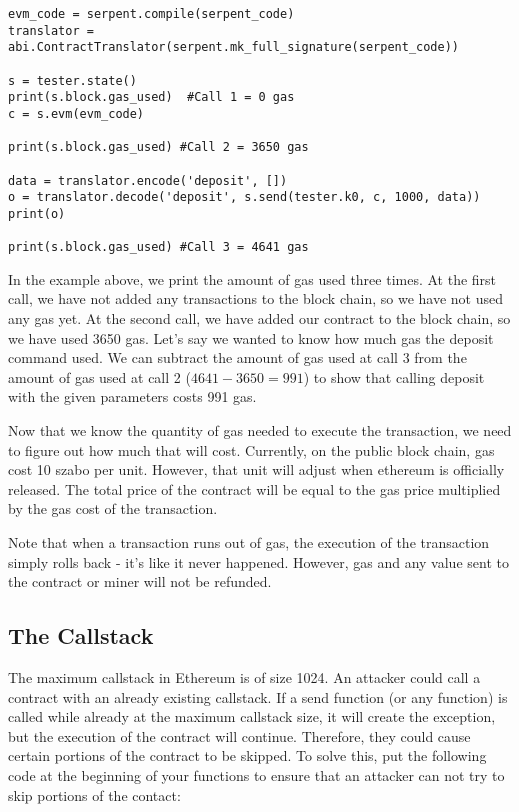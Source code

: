 \documentclass[12pt]{article}
\begin{document}
\begin{verbatim}
evm_code = serpent.compile(serpent_code)
translator = abi.ContractTranslator(serpent.mk_full_signature(serpent_code))

s = tester.state()
print(s.block.gas_used)  #Call 1 = 0 gas
c = s.evm(evm_code)

print(s.block.gas_used) #Call 2 = 3650 gas

data = translator.encode('deposit', [])
o = translator.decode('deposit', s.send(tester.k0, c, 1000, data))
print(o)

print(s.block.gas_used) #Call 3 = 4641 gas
\end{verbatim}

In the example above, we print the amount of gas used three times. At the first call, we have not added any transactions to the block chain, so we have not used any gas yet. At the second call, we have added our contract to the block chain, so we have used 3650 gas. Let's say we wanted to know how much gas the deposit command used. We can subtract the amount of gas used at call 3 from the amount of gas used at call 2 ($4641-3650 = 991$) to show that calling deposit with the given parameters costs 991 gas. 

Now that we know the quantity of gas needed to execute the transaction, we need to figure out how much that will cost. Currently, on the public block chain, gas cost 10 szabo per unit. However, that unit will adjust when ethereum is officially released. The total price of the contract will be equal to the gas price multiplied by the gas cost of the transaction.

Note that when a transaction runs out of gas, the execution of the transaction simply rolls back - it's like it never happened. However, gas and any value sent to the contract or miner will not be refunded. \cite{Subtleties, WhatOptions}

\subsection{The Callstack}

The maximum callstack in Ethereum is of size 1024. An attacker could call a contract with an already existing callstack. If a send function (or any function) is called while already at the maximum callstack size, it will create the exception, but the execution of the contract will continue. Therefore, they could cause certain portions of the contract to be skipped. To solve this, put the following code at the beginning of your functions to ensure that an attacker can not try to skip portions of the contact:
\end{document}
